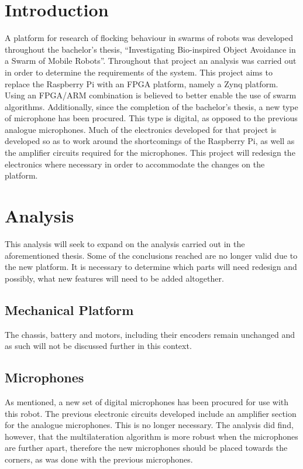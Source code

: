 \section{Introduction}
A platform for research of flocking behaviour in swarms of robots was developed throughout the bachelor's thesis, ``Investigating Bio-inspired Object Avoidance in a Swarm of Mobile Robots''.
Throughout that project an analysis was carried out in order to determine the requirements of the system.
This project aims to replace the Raspberry Pi with an FPGA platform, namely a Zynq platform.
Using an FPGA/ARM combination is believed to better enable the use of swarm algorithms.
Additionally, since the completion of the bachelor's thesis, a new type of microphone has been procured.
This type is digital, as opposed to the previous analogue microphones.
Much of the electronics developed for that project is developed so as to work around the shortcomings of the Raspberry Pi, as well as the amplifier circuits required for the microphones.
This project will redesign the electronics where necessary in order to accommodate the changes on the platform.

\section{Analysis} %
\label{sec:analysis}
This analysis will seek to expand on the analysis carried out in the aforementioned thesis.
Some of the conclusions reached are no longer valid due to the new platform.
It is necessary to determine which parts will need redesign and possibly, what new features will need to be added altogether.

\subsection{Mechanical Platform} %
\label{sub:mechanical_platform}
The chassis, battery and motors, including their encoders remain unchanged and as such will not be discussed further in this context.

\subsection{Microphones} %
\label{sub:microphones}
As mentioned, a new set of digital microphones has been procured for use with this robot.
The previous electronic circuits developed include an amplifier section for the analogue microphones.
This is no longer necessary.
The analysis did find, however, that the multilateration algorithm is more robust when the microphones are further apart, therefore the new microphones should be placed towards the corners, as was done with the previous microphones.


